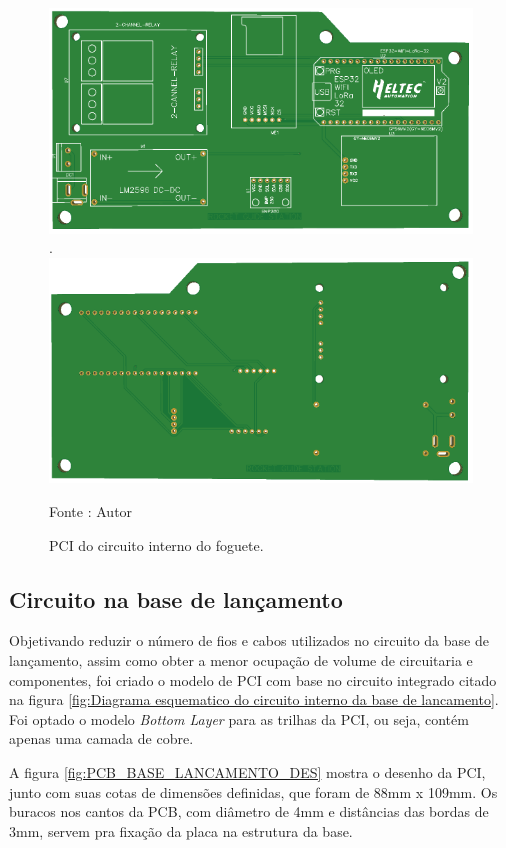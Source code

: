 \begin{figure}[H]
  \centering
  \includegraphics[scale=0.4]{figuras/PDFs/final eletronica/foguete_top.png}.
    \includegraphics[scale=0.4]{figuras/PDFs/final eletronica/foguete_bottom.png}
  \caption{PCI do circuito interno do foguete.} 
  {\footnotesize Fonte : Autor } 
  \label{fig:PCB_FOGUETE}
\end{figure}


\subsection{Circuito na base de lançamento}
\label{sec:base_de_lancamento}

Objetivando reduzir o número de fios e cabos utilizados no circuito da base de lançamento, assim como obter a menor ocupação de volume de circuitaria e componentes, foi criado o modelo de PCI com base no circuito integrado citado na figura \ref{fig:Diagrama esquematico do circuito interno da base de lancamento}. Foi optado o modelo \textit{Bottom Layer} para as trilhas da PCI, ou seja, contém apenas uma camada de cobre.

A figura \ref{fig:PCB_BASE_LANCAMENTO_DES} mostra o desenho da PCI, junto com suas cotas de dimensões definidas, que foram de 88mm x 109mm. Os buracos nos cantos da PCB, com diâmetro de 4mm e distâncias das bordas de 3mm, servem pra fixação da placa na estrutura da base.

